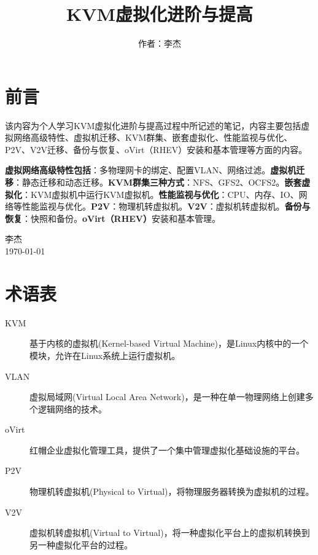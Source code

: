 \documentclass[12pt, twoside, openany]{book}
\theoremstyle{brack}
\begin{document}
\frontmatter
\title{\heiti \textbf{KVM}虚拟化进阶与提高}
\author{\kaishu 作者：李杰}
\date{\empty}
\maketitle


\setcounter{page}{1}
\pagestyle{plain}


\chapter*{前\hspace{2em}言}
该内容为个人学习KVM虚拟化进阶与提高过程中所记述的笔记，内容主要包括虚拟网络高级特性、虚拟机迁移、KVM群集、嵌套虚拟化、性能监视与优化、P2V、V2V迁移、备份与恢复、oVirt（RHEV）安装和基本管理等方面的内容。

\textbf{虚拟网络高级特性包括}：多物理网卡的绑定、配置VLAN、网络过滤。\textbf{虚拟机迁移}：静态迁移和动态迁移。\textbf{KVM群集三种方式}：NFS、GFS2、OCFS2。\textbf{嵌套虚拟化}：KVM虚拟机中运行KVM虚拟机。\textbf{性能监视与优化}：CPU、内存、IO、网络等性能监视与优化。\textbf{P2V}：物理机转虚拟机。\textbf{V2V}：虚拟机转虚拟机。\textbf{备份与恢复}：快照和备份。\textbf{oVirt（RHEV）}安装和基本管理。

\begin{flushright}
\kaishu 李杰\\
\today
\end{flushright}

\chapter*{术\hspace{1.8em}语\hspace{1.8em}表}
\begin{description}
\item[KVM] 基于内核的虚拟机(Kernel-based Virtual Machine)，是Linux内核中的一个模块，允许在Linux系统上运行虚拟机。
\item[VLAN] 虚拟局域网(Virtual Local Area Network)，是一种在单一物理网络上创建多个逻辑网络的技术。
\item[oVirt] 红帽企业虚拟化管理工具，提供了一个集中管理虚拟化基础设施的平台。
\item[P2V] 物理机转虚拟机(Physical to Virtual)，将物理服务器转换为虚拟机的过程。
\item[V2V] 虚拟机转虚拟机(Virtual to Virtual)，将一种虚拟化平台上的虚拟机转换到另一种虚拟化平台的过程。
\end{description}
\end{document}
